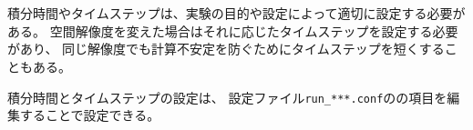 \section{\SecBasicIntegrationSetting} \label{sec:timeintiv}
積分時間やタイムステップは、実験の目的や設定によって適切に設定する必要がある。
空間解像度を変えた場合はそれに応じたタイムステップを設定する必要があり、
同じ解像度でも計算不安定を防ぐためにタイムステップを短くすることもある。

積分時間とタイムステップの設定は、
設定ファイル\verb|run_***.conf|のの項目を編集することで設定できる。\\


